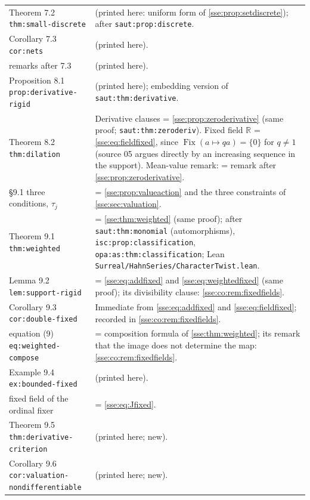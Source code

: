 \documentclass[11pt,a4paper]{article}
\numberwithin{equation}{section}
\theoremstyle{plain}
\theoremstyle{definition}
\theoremstyle{remark}
\newcommand{\R}{\mathbb{R}}
\newcommand{\Fix}{\operatorname{Fix}}
\newcommand{\lbl}[1]{\nolinkurl{#1}}%
\newcommand{\fn}[1]{\nolinkurl{#1}}%
\begin{document}
\begin{longtable}{P{34mm}P{116mm}}
Theorem 7.2 \fn{thm:small-discrete} &  (printed here: uniform form of \cref{sse:prop:setdiscrete}); after \lbl{saut:prop:discrete}. \\
Corollary 7.3 \fn{cor:nets} &  (printed here). \\
remarks after 7.3 &  (printed here). \\
Proposition 8.1 \fn{prop:derivative-rigid} &  (printed here); embedding version of \lbl{saut:thm:derivative}. \\
Theorem 8.2 \fn{thm:dilation} & Derivative clauses = \cref{sse:prop:zeroderivative} (same proof; \lbl{saut:thm:zeroderiv}). Fixed field $\R$ = \eqref{sse:eq:fieldfixed}, since $\Fix(a\mapsto qa)=\{0\}$ for $q\ne1$ (source 05 argues directly by an increasing sequence in the support). Mean-value remark: = remark after \cref{sse:prop:zeroderivative}. \\
\S9.1 three conditions, $\tau_j$ & = \cref{sse:prop:valueaction} and the three constraints of \cref{sse:sec:valuation}. \\
Theorem 9.1 \fn{thm:weighted} & = \cref{sse:thm:weighted} (same proof); after \lbl{saut:thm:monomial} (automorphisms), \lbl{isc:prop:classification}, \lbl{opa:as:thm:classification}; Lean \fn{Surreal/HahnSeries/CharacterTwist.lean}. \\
Lemma 9.2 \fn{lem:support-rigid} & = \eqref{sse:eq:addfixed} and \eqref{sse:eq:weightedfixed} (same proof); its divisibility clause: \cref{sse:co:rem:fixedfields}. \\
Corollary 9.3 \fn{cor:double-fixed} & Immediate from \eqref{sse:eq:addfixed} and \eqref{sse:eq:fieldfixed}; recorded in \cref{sse:co:rem:fixedfields}. \\
equation (9) \fn{eq:weighted-compose} & = composition formula of \cref{sse:thm:weighted}; its remark that the image does not determine the map: \cref{sse:co:rem:fixedfields}. \\
Example 9.4 \fn{ex:bounded-fixed} &  (printed here). \\
fixed field of the ordinal fixer & = \eqref{sse:eq:Jfixed}. \\
Theorem 9.5 \fn{thm:derivative-criterion} &  (printed here; new). \\
Corollary 9.6 \fn{cor:valuation-nondifferentiable} &  (printed here; new). \\

\end{longtable}
\end{document}
